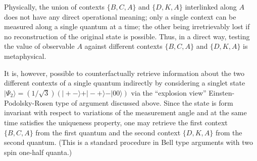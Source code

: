 \documentclass{aipproc}
\begin{document}
Physically, the union of contexts $\{B,C,A\}$ and $\{D,K,A\}$ interlinked along $A$ does not have any direct
operational meaning; only a single context can be measured along a single quantum at a time;
the other being irretrievably lost if no reconstruction of the original state is possible.
Thus, in a direct way, testing the value of observable $A$ against different
contexts $\{B,C,A\}$ and $\{D,K,A\}$ is metaphysical.


It is, however, possible to counterfactually retrieve information
about the two different contexts of a single quantum indirectly
by considering a singlet state
$
\vert \Psi_2 \rangle
= ({1/ \sqrt{3}})(
\vert + -\rangle
+
\vert - +\rangle
-
\vert 0 0\rangle
)$
via the ``explosion view'' Einsten-Podolsky-Rosen type of argument discussed above.
Since the state is form invariant with respect to variations of the measurement angle
and at the same time satisfies the uniqueness property,
one may retrieve the first context
$\{B,C,A\}$ from the first quantum
and the second context $\{D,K,A\}$ from the second quantum.
(This is a standard procedure in Bell type arguments with two spin one-half quanta.)
\end{document}
